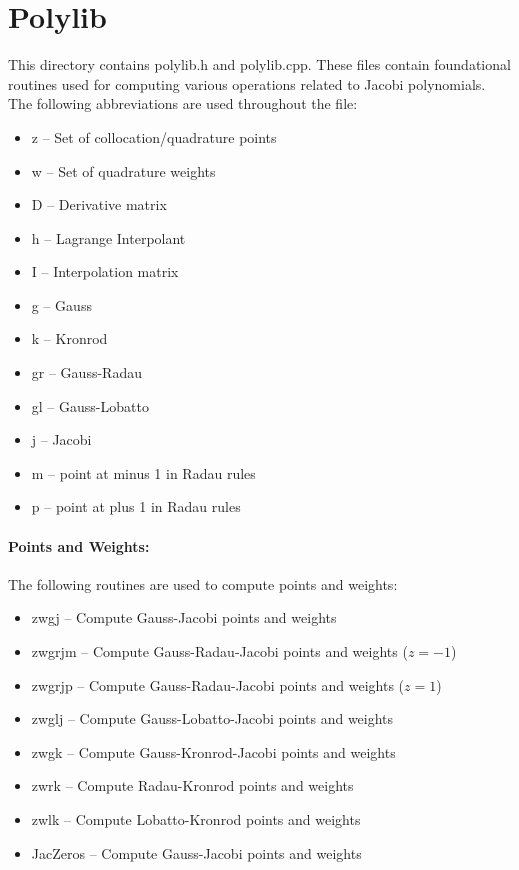 %
\section{Polylib}

This directory contains polylib.h and polylib.cpp.  These files contain foundational routines used for computing various operations related to Jacobi polynomials.
The following abbreviations are used throughout the file:

\begin{itemize}
\item z   --   Set of collocation/quadrature points
%
\item w   --   Set of quadrature weights
%
\item D   --   Derivative matrix
%
\item h   --   Lagrange Interpolant
%
\item I    --   Interpolation matrix
%
\item g   --   Gauss
%
\item	 k   --   Kronrod
%
\item  gr  --   Gauss-Radau
%
\item  gl  --   Gauss-Lobatto
%
\item  j    --   Jacobi
%
\item  m  --   point at minus 1 in Radau rules
%
\item  p  --   point at plus  1 in Radau rules
\end{itemize}


\paragraph{Points and Weights: }  The following routines are used to compute points and weights:

\begin{itemize}
\item zwgj    --   Compute Gauss-Jacobi points and weights
%
\item zwgrjm  --   Compute Gauss-Radau-Jacobi points and weights ($z=-1$)
%
\item zwgrjp  --  Compute Gauss-Radau-Jacobi  points and weights ($z=1$)
%
\item zwglj    --  Compute Gauss-Lobatto-Jacobi points and weights
%
\item	zwgk   --  Compute Gauss-Kronrod-Jacobi points and weights
%
\item	zwrk   --  Compute Radau-Kronrod points and weights
%
\item	zwlk  --  Compute Lobatto-Kronrod points and weights
%
\item	 JacZeros  --  Compute Gauss-Jacobi points and weights
\end{itemize}

